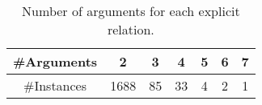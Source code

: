\begin{table}[ht]
\centering
\begin{tabular}{|c|c|c|c|c|c|c|}
\hline

\#Arguments              & 2    & 3   & 4   & 5   & 6  & 7  \\ \hline
\#Instances              & 1688 & 85  & 33  & 4   & 2  & 1  \\ \hline

\end{tabular}
\caption{\label{t:argument-num} Number of arguments for each explicit relation. }
\end{table}
